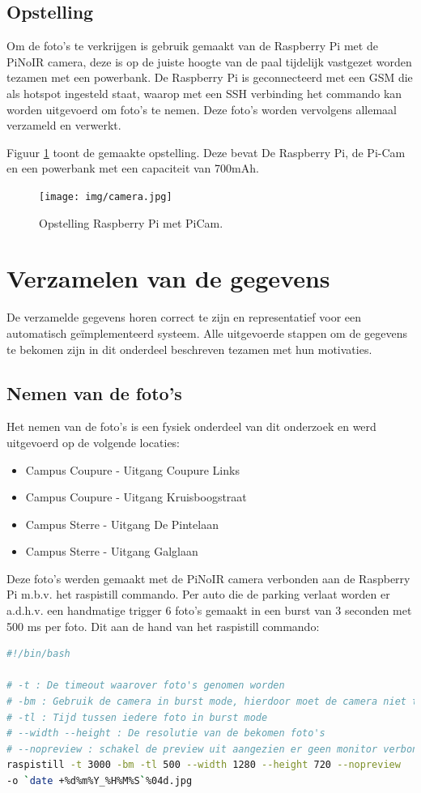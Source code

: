 \subsection{Opstelling}
Om de foto's te verkrijgen is gebruik gemaakt van de Raspberry Pi met de PiNoIR camera, deze is op de juiste hoogte van de paal tijdelijk vastgezet worden tezamen met een powerbank. De Raspberry Pi is geconnecteerd met een GSM die als hotspot ingesteld staat, waarop met een SSH verbinding het commando kan worden uitgevoerd om foto's te nemen. Deze foto's worden vervolgens allemaal verzameld en verwerkt.

Figuur \ref{Opstelling} toont de gemaakte opstelling. Deze bevat De Raspberry Pi, de Pi-Cam en een powerbank met een capaciteit van 700mAh.
\begin{figure}[h]
	\centering
	\texttt{[image: img/camera.jpg]}
	\caption{Opstelling Raspberry Pi met PiCam.}
	\label{Opstelling}
\end{figure}

\section{Verzamelen van de gegevens}
De verzamelde gegevens horen correct te zijn en representatief voor een automatisch geïmplementeerd systeem. Alle uitgevoerde stappen om de gegevens te bekomen zijn in dit onderdeel beschreven tezamen met hun motivaties.

\subsection{Nemen van de foto's}
Het nemen van de foto's is een fysiek onderdeel van dit onderzoek en werd uitgevoerd op de volgende locaties:
\begin{itemize}
	\item Campus Coupure - Uitgang Coupure Links
	\item Campus Coupure - Uitgang Kruisboogstraat
	\item Campus Sterre - Uitgang De Pintelaan
	\item Campus Sterre - Uitgang Galglaan
\end{itemize}

Deze foto's werden gemaakt met de PiNoIR camera verbonden aan de Raspberry Pi m.b.v. het raspistill commando. Per auto die de parking verlaat worden er a.d.h.v. een handmatige trigger 6 foto's gemaakt in een burst van 3 seconden met 500 ms per foto. Dit aan de hand van het raspistill commando:  
\begin{lstlisting}[language=Bash, breaklines=true]
#!/bin/bash

# -t : De timeout waarover foto's genomen worden
# -bm : Gebruik de camera in burst mode, hierdoor moet de camera niet telkens opnieuw focussen tussen iedere genomen foto
# -tl : Tijd tussen iedere foto in burst mode
# --width --height : De resolutie van de bekomen foto's
# --nopreview : schakel de preview uit aangezien er geen monitor verbonden is
raspistill -t 3000 -bm -tl 500 --width 1280 --height 720 --nopreview
-o `date +%d%m%Y_%H%M%S`%04d.jpg
\end{lstlisting}

